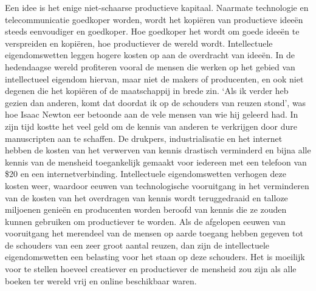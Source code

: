 Een idee is het enige niet-schaarse productieve kapitaal. Naarmate technologie en telecommunicatie goedkoper worden, wordt het kopiëren van productieve ideeën steeds eenvoudiger en goedkoper. Hoe goedkoper het wordt om goede ideeën te verspreiden en kopiëren, hoe productiever de wereld wordt. Intellectuele eigendomswetten leggen hogere kosten op aan de overdracht van ideeën. In de hedendaagse wereld profiteren vooral de mensen die werken op het gebied van intellectueel eigendom hiervan, maar niet de makers of producenten, en ook niet degenen die het kopiëren of de maatschappij in brede zin. `Als ik verder heb gezien dan anderen, komt dat doordat ik op de schouders van reuzen stond', was hoe Isaac Newton eer betoonde aan de vele mensen van wie hij geleerd had. In zijn tijd kostte het veel geld om de kennis van anderen te verkrijgen door dure manuscripten aan te schaffen. De drukpers, industrialisatie en het internet hebben de kosten van het verwerven van kennis drastisch verminderd en bijna alle kennis van de mensheid toegankelijk gemaakt voor iedereen met een telefoon van \$20 en een internetverbinding. Intellectuele eigendomswetten verhogen deze kosten weer, waardoor eeuwen van technologische vooruitgang in het verminderen van de kosten van het overdragen van kennis wordt teruggedraaid en talloze miljoenen genieën en producenten worden beroofd van kennis die ze zouden kunnen gebruiken om productiever te worden. Als de afgelopen eeuwen van vooruitgang het merendeel van de mensen op aarde toegang hebben gegeven tot de schouders van een zeer groot aantal reuzen, dan zijn de intellectuele eigendomswetten een belasting voor het staan op deze schouders. Het is moeilijk voor te stellen hoeveel creatiever en productiever de mensheid zou zijn als alle boeken ter wereld vrij en online beschikbaar waren.
